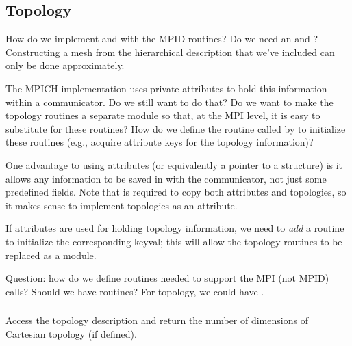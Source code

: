 \documentclass{article}
\begin{document}
\subsubsection{}
\subsubsection{}

\subsection{Topology}

How do we implement  and 
with the MPID routines?   
Do we need an  and
?  Constructing a mesh from the 
hierarchical description that we've included can only be done
approximately.

The MPICH implementation uses private attributes to hold this information 
within a communicator.  Do we still want to do that?  Do we want to make the
topology routines a separate module so that, at the MPI level, it is easy to
substitute for these routines?  How do we define the routine called by
 to initialize these routines (e.g., acquire attribute keys
for the topology information)?

One advantage to using attributes (or equivalently a pointer to a
structure) is it allows any information to be saved in with the
communicator, not just some predefined fields.  Note that
 is required to copy both attributes and
topologies, so it makes sense to implement topologies as an attribute.

If attributes are used for holding topology information, we need to
\emph{add} a routine to initialize the corresponding keyval; this will
allow the topology routines to be replaced as a module.

Question: how do we define routines needed to support the MPI (not
MPID) calls?  Should we have  routines?  For topology, we
could have .

\subsubsection{}
Access the topology description and return the number of dimensions of
Cartesian topology (if defined).
\end{document}
